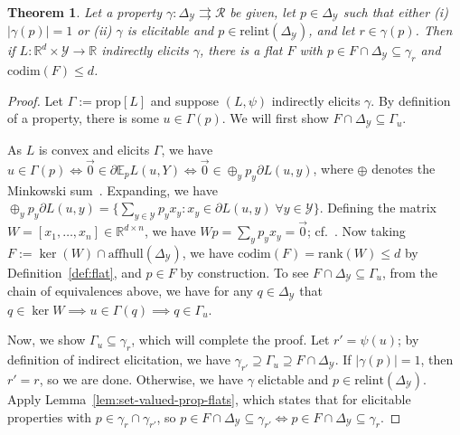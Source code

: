 \documentclass{article}
\newcommand{\reals}{\mathbb{R}}
\newcommand{\simplex}{\Delta_\Y}
\newcommand{\relint}[1]{\mathrm{relint}(#1)}
\newcommand{\prop}[1]{\mathrm{prop}[#1]}
\newcommand{\codim}{\mathrm{codim}}
\newcommand{\rank}{\mathrm{rank}}
\newcommand{\affhull}{\mathrm{affhull}}
\newcommand{\E}{\mathbb{E}}
\newcommand{\R}{\mathcal{R}}
\newcommand{\Y}{\mathcal{Y}}
\newcommand{\exploss}[3]{\E_{#3} #1(#2,Y)}
\newcommand{\toto}{\rightrightarrows}
\newtheorem{theorem}{Theorem}
\begin{document}
\begin{theorem}\label{thm:cvx-flats}
  Let a property $\gamma:\simplex\toto\R$ be given, let $p\in\simplex$ such that either (i) $|\gamma(p)|=1$ or (ii) $\gamma$ is elicitable and $p\in\relint\simplex$, and let $r\in\gamma(p)$.
Then if $L: \reals^d \times \Y \to \reals$ indirectly elicits $\gamma$, there is a flat $F$ with $p\in F \cap \simplex \subseteq \gamma_r$ and $\codim(F) \leq d$.
\end{theorem}
\begin{proof}

%

	Let $\Gamma := \prop{L}$ and suppose $(L, \psi)$ indirectly elicits $\gamma$.
	By definition of a property, there is some $u \in \Gamma(p)$.
	We will first show $F \cap \simplex \subseteq \Gamma_u$.

	As $L$ is convex and elicits $\Gamma$, we have $u \in \Gamma(p) \iff \vec 0 \in \partial \exploss{L}{u}{p} \iff \vec 0 \in \oplus_y p_y \partial L(u,y)$, where $\oplus$ denotes the Minkowski sum~\citep[Theorem 4.1.1]{hiriart2012fundamentals}.
	Expanding, we have $\oplus_y p_y \partial L(u,y) = \{ \sum_{y\in\Y} p_y x_y : x_y \in \partial L(u,y) \; \forall y\in\Y\}$.
	Defining the matrix $W = [x_1, \ldots, x_n] \in \reals^{d\times n}$, we have $W p = \sum_y p_y x_y = \vec 0$;
  cf.~\cite[$\mathbf{A}^m$ in Theorem 16]{ramaswamy2016convex}.
	Now taking $F := \ker(W) \cap \affhull(\simplex)$, we have $\codim(F) = \rank(W) \leq d$ by Definition~\ref{def:flat}, and $p \in F$ by construction.
	To see $F \cap \simplex \subseteq \Gamma_u$, from the chain of equivalences above, we have for any $q\in\simplex$ that $q \in \ker W \implies u \in \Gamma(q) \implies q \in \Gamma_u$.

	Now, we show $\Gamma_u \subseteq \gamma_r$, which will complete the proof.
	Let $r' = \psi(u)$; by definition of indirect elicitation, we have $\gamma_{r'} \supseteq \Gamma_u \supseteq F \cap \simplex$.
	If $|\gamma(p)| = 1$, then $r' = r$, so we are done.
	Otherwise, we have $\gamma$ elictable and $p \in \relint{\simplex}$.
	Apply Lemma~\ref{lem:set-valued-prop-flats}, which states that for elicitable properties with $p \in \gamma_r \cap \gamma_{r'}$, so $p \in F \cap \simplex \subseteq \gamma_{r'} \iff p \in F \cap \simplex \subseteq \gamma_r$.
\end{proof}
\end{document}
